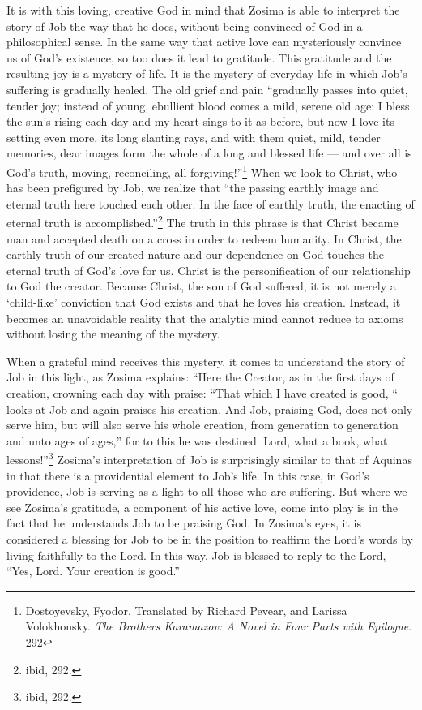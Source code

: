 It is with this loving, creative God in mind that Zosima is able to interpret the story of Job the way that  he does, without being convinced of God in a philosophical sense. In the same way that active love can mysteriously convince us of God's existence, so too does it lead to gratitude. This gratitude and the resulting joy is a mystery of life.  It is the mystery of everyday life in which Job's suffering is gradually healed. The old grief and pain ``gradually passes into quiet, tender joy; instead of young, ebullient blood comes a mild, serene old age: I bless the sun's rising each day and my heart sings to it as before, but now I love its setting even more, its long slanting rays, and with them quiet, mild, tender memories, dear images form the whole of a long and blessed life --- and over all is God's truth, moving, reconciling, all-forgiving!''\footnote{Dostoyevsky, Fyodor. Translated by Richard Pevear, and Larissa Volokhonsky. \emph{The Brothers Karamazov: A Novel in Four Parts with Epilogue}. 292} When we look to Christ, who has been prefigured by Job, we realize that ``the passing earthly image and eternal truth here touched each other. In the face of earthly truth, the enacting of eternal truth is accomplished.''\footnote{ibid, 292.}  The truth in this phrase is that Christ became man and accepted death on a cross in order to redeem humanity.  In Christ, the earthly truth of our created nature and our dependence on God touches the eternal truth of God's love for us.  Christ is the personification of our relationship to God the creator.  Because Christ, the son of God suffered, it is not merely a `child-like' conviction that God exists and that he loves his creation. Instead, it becomes an unavoidable reality that the analytic mind cannot reduce to axioms without losing the meaning of the mystery. 

When a grateful mind receives this mystery, it comes to understand the story of Job in this light, as Zosima explains: ``Here the Creator, as in the first days of creation, crowning each day with praise: ``That which I have created is good, `` looks at Job and again praises his creation. And Job, praising God, does not only serve him, but will also serve his whole creation, from generation to generation and unto ages of ages,'' for to this he was destined. Lord, what a book, what lessons!''\footnote{ibid, 292.} Zosima's interpretation of Job is surprisingly similar to that of Aquinas in that there is a providential element to Job's life. In this case, in God's providence, Job is serving as a light to all those who are suffering. But where we see Zosima's gratitude, a component of his active love, come into play is in the fact that he understands Job to be praising God. In Zosima's eyes, it is considered a blessing for Job to be in the position to reaffirm the Lord's words by living faithfully to the Lord. In this way, Job is blessed to reply to the Lord, ``Yes, Lord. Your creation is good.''

